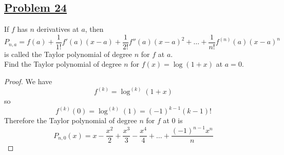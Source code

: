 \documentclass[10pt,letterpaper]{article}
\begin{document}
	
	
	\subsection*{{\color{purple}\underline{Problem 24}}}
	If $f$ has $n$ derivatives at $a$, then
	$$P_{n,a} = f(a) + \dfrac{1}{1!}f'(a)(x - a) + 
	\dfrac{1}{2!}f''(a)(x - a)^2 + \ldots + \dfrac{1}{n!} f^{(n)}(a)(x - a)^n$$
	is called the Taylor polynomial of degree $n$ for $f$ at $a$. \\
	Find the Taylor polynomial of degree $n$ for $f(x) = \log(1 + x)$ at $a = 0$.
	\begin{proof}
	We have $$f^{(k)} = \log^{(k)}(1 + x)$$	
	so $$f^{(k)}(0) = \log^{(k)}(1) = (-1)^{k-1}(k - 1)!$$
	Therefore the Taylor polynomial of degree $n$ for $f$ at $0$ is
$$P_{n,0}(x) = x - \dfrac{x^2}{2} + \dfrac{x^3}{3} - \dfrac{x^4}{4} + \ldots
+ \dfrac{(-1)^{n-1}x^n}{n}$$
	\end{proof}
	
	
	
\end{document}
